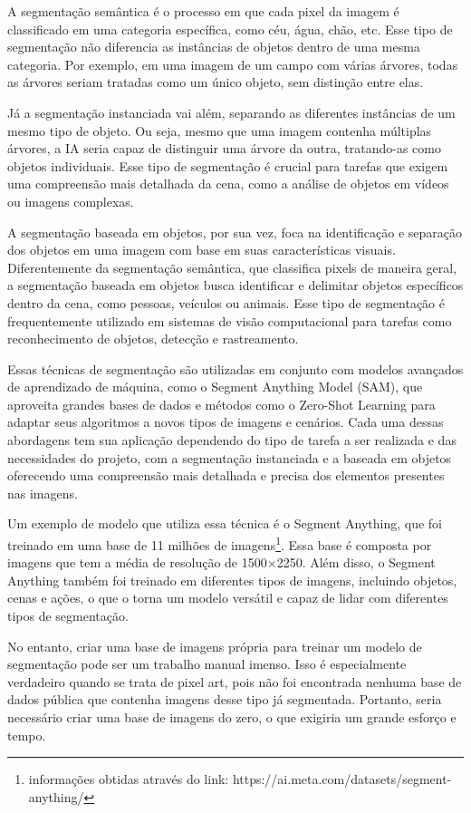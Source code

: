 A segmentação semântica é o processo em que cada pixel da imagem é classificado em uma categoria específica, como céu, água, chão, etc. Esse tipo de segmentação não diferencia as instâncias de objetos dentro de uma mesma categoria. Por exemplo, em uma imagem de um campo com várias árvores, todas as árvores seriam tratadas como um único objeto, sem distinção entre elas.

Já a segmentação instanciada vai além, separando as diferentes instâncias de um mesmo tipo de objeto. Ou seja, mesmo que uma imagem contenha múltiplas árvores, a IA seria capaz de distinguir uma árvore da outra, tratando-as como objetos individuais. Esse tipo de segmentação é crucial para tarefas que exigem uma compreensão mais detalhada da cena, como a análise de objetos em vídeos ou imagens complexas.

A segmentação baseada em objetos, por sua vez, foca na identificação e separação dos objetos em uma imagem com base em suas características visuais. Diferentemente da segmentação semântica, que classifica pixels de maneira geral, a segmentação baseada em objetos busca identificar e delimitar objetos específicos dentro da cena, como pessoas, veículos ou animais. Esse tipo de segmentação é frequentemente utilizado em sistemas de visão computacional para tarefas como reconhecimento de objetos, detecção e rastreamento.

Essas técnicas de segmentação são utilizadas em conjunto com modelos avançados de aprendizado de máquina, como o Segment Anything Model (SAM), que aproveita grandes bases de dados e métodos como o Zero-Shot Learning para adaptar seus algoritmos a novos tipos de imagens e cenários. Cada uma dessas abordagens tem sua aplicação dependendo do tipo de tarefa a ser realizada e das necessidades do projeto, com a segmentação instanciada e a baseada em objetos oferecendo uma compreensão mais detalhada e precisa dos elementos presentes nas imagens.

Um exemplo de modelo que utiliza essa técnica é o Segment Anything, que foi treinado em uma base de 11 milhões de imagens\footnote{informações obtidas através do link: https://ai.meta.com/datasets/segment-anything/}. Essa base é composta por imagens que tem a média de resolução de 1500×2250. Além disso, o Segment Anything também foi treinado em diferentes tipos de imagens, incluindo objetos, cenas e ações, o que o torna um modelo versátil e capaz de lidar com diferentes tipos de segmentação.

No entanto, criar uma base de imagens própria para treinar um modelo de segmentação pode ser um trabalho manual imenso. Isso é especialmente verdadeiro quando se trata de pixel art, pois não foi encontrada nenhuma base de dados pública que contenha imagens desse tipo já segmentada. Portanto, seria necessário criar uma base de imagens do zero, o que exigiria um grande esforço e tempo.

